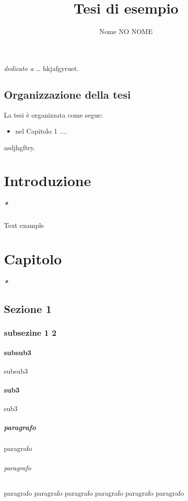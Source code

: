 \documentclass[12pt]{report}
\begin{document}
\title{Tesi di esempio}
\author{Nome NO NOME}

%
% 
%
\beforepreface
\prefacesection{}
        {\hfill \Large {\sl dedicato a \dots}}
% 
%
hkjafgyruet.
%
%
\section*{Organizzazione della tesi}
\label{organizzazione}
La tesi \`e organizzata come segue:
\begin{itemize}
\item nel Capitolo 1 ....
\end{itemize}
%
%
asdjhgftry.
\afterpreface
% 
% 

\chapter{Introduzione}
\label{cap1}

\paragraph{*}

Text example



\chapter{Capitolo}
\label{cap2}
\paragraph{*}

\section{Sezione 1}
\subsection{subsezine 1 2}
\subsubsection{subsub3} subsub3
\subsubsection{sub3} sub3
\paragraph{paragrafo} paragrafo
\subparagraph{paragrafo} paragrafo paragrafo paragrafo
paragrafo paragrafo paragrafo
\end{document}
